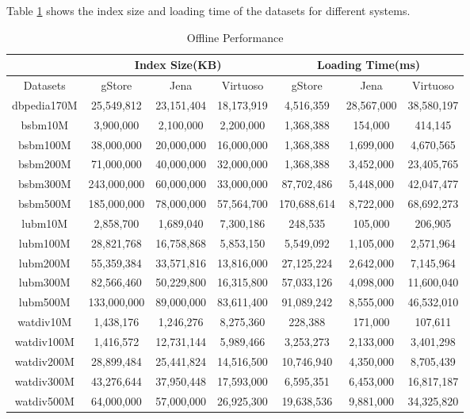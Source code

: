 \documentclass[titlepage, a4paper, 12pt] {article}
\begin{document}
Table \ref{table:loading} shows the index size and loading time of the datasets
for different systems.

\begin{table}[htp]
	\small
	\begin{threeparttable}
		\begin{tabular}{|c||c|c|c||c|c|c|}
			\hline
			& \multicolumn{3}{c||}{Index Size(KB)}& \multicolumn{3}{c|}{Loading Time(ms)}\\
			\hline
			\hline
			Datasets & gStore & Jena & Virtuoso & gStore & Jena & Virtuoso \\
			\hline
			dbpedia170M & 25,549,812 &	23,151,404	& 18,173,919 & 4,516,359	& 28,567,000 & 38,580,197	\\
			\hline
			bsbm10M & 3,900,000 &	2,100,000	& 2,200,000 & 1,368,388	& 154,000 & 414,145	\\
			\hline
			bsbm100M & 38,000,000 &	20,000,000	& 16,000,000 & 1,368,388	& 1,699,000 & 4,670,565	\\
			\hline
			bsbm200M & 71,000,000 &	40,000,000	& 32,000,000 & 1,368,388	& 3,452,000 & 23,405,765	\\
			\hline
			bsbm300M & 243,000,000 &	60,000,000	& 33,000,000 & 87,702,486	& 5,448,000 & 42,047,477	\\
			\hline
			bsbm500M & 185,000,000 &	78,000,000	& 57,564,700 & 170,688,614	& 8,722,000 & 68,692,273	\\
			\hline
			lubm10M  &2,858,700 &1,689,040 & 7,300,186 &	248,535 &	105,000 & 206,905	 \\
			\hline
			lubm100M & 28,821,768 &	16,758,868 & 5,853,150 & 5,549,092	& 1,105,000 & 2,571,964  \\
			\hline
			lubm200M & 55,359,384 &	33,571,816 & 13,816,000 & 27,125,224	& 2,642,000 & 7,145,964  \\
			\hline
			lubm300M & 82,566,460 &	50,229,800 & 16,315,800 & 57,033,126	& 4,098,000 & 11,600,040  \\
			\hline
			lubm500M & 133,000,000 & 89,000,000 & 83,611,400 & 91,089,242	& 8,555,000 & 46,532,010  \\
			\hline
			watdiv10M & 1,438,176 &	1,246,276 & 8,275,360 & 228,388	& 171,000 & 107,611  \\
			\hline
			watdiv100M & 1,416,572 & 12,731,144	 & 5,989,466 & 3,253,273 & 2,133,000 & 3,401,298	\\
			\hline
			watdiv200M & 28,899,484 &	25,441,824 & 14,516,500 & 10,746,940	& 4,350,000	& 8,705,439 \\
			\hline
			watdiv300M & 43,276,644 &	37,950,448	 & 17,593,000 & 6,595,351	& 6,453,000 & 16,817,187 \\
			\hline
			watdiv500M & 64,000,000 &	57,000,000	 & 26,925,300 & 19,638,536	& 9,881,000 & 34,325,820 \\
			\hline
		\end{tabular}
	\end{threeparttable}
	\caption{Offline Performance}
	\label{table:loading}
\end{table}
\end{document}
